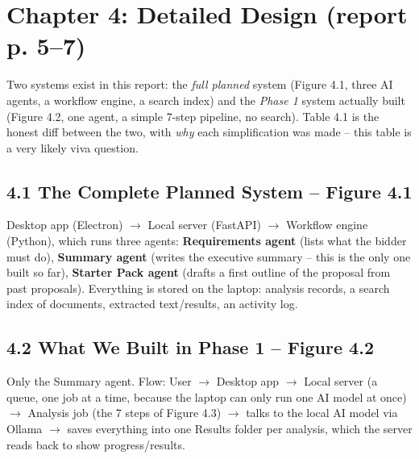 \documentclass[11pt,a4paper]{article}
\begin{document}
\newpage
\section{Chapter 4: Detailed Design (report p. 5--7)}

\begin{bigpicture}
Two systems exist in this report: the \emph{full planned} system (Figure 4.1, three AI agents,
a workflow engine, a search index) and the \emph{Phase 1} system actually built (Figure 4.2, one
agent, a simple 7-step pipeline, no search). Table 4.1 is the honest diff between the two, with
\emph{why} each simplification was made -- this table is a very likely viva question.
\end{bigpicture}

\subsection*{4.1 The Complete Planned System -- Figure 4.1}
Desktop app (Electron) $\to$ Local server (FastAPI) $\to$ Workflow engine (Python), which runs three
agents: \textbf{Requirements agent} (lists what the bidder must do), \textbf{Summary agent} (writes
the executive summary -- this is the only one built so far), \textbf{Starter Pack agent} (drafts a
first outline of the proposal from past proposals). Everything is stored on the laptop: analysis
records, a search index of documents, extracted text/results, an activity log.

\subsection*{4.2 What We Built in Phase 1 -- Figure 4.2}
Only the Summary agent. Flow: User $\to$ Desktop app $\to$ Local server (a queue, one job at a time,
because the laptop can only run one AI model at once) $\to$ Analysis job (the 7 steps of Figure 4.3)
$\to$ talks to the local AI model via Ollama $\to$ saves everything into one Results folder per
analysis, which the server reads back to show progress/results.
\end{document}
